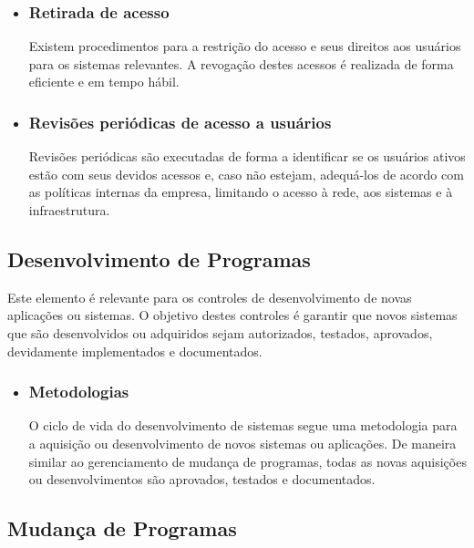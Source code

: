 \begin{itemize}
\item	\subsubsection{Retirada de acesso}
	Existem procedimentos para a restrição do acesso e seus direitos aos usuários para os sistemas relevantes. A revogação destes acessos é realizada de forma eficiente e em tempo hábil.
\item	\subsubsection{Revisões periódicas de acesso a usuários}
	Revisões periódicas são executadas de forma a identificar se os usuários ativos estão com seus devidos acessos e, caso não estejam, adequá-los de acordo com as políticas internas da empresa, limitando o acesso à rede, aos sistemas e à infraestrutura.
\end{itemize}
\subsection{Desenvolvimento de Programas}
	Este elemento é relevante para os controles de desenvolvimento de novas aplicações ou sistemas. O objetivo destes controles é garantir que novos sistemas que são desenvolvidos ou adquiridos sejam autorizados, testados, aprovados, devidamente implementados e documentados.
	
\begin{itemize}
\item	\subsubsection{Metodologias}
	O ciclo de vida do desenvolvimento de sistemas segue uma metodologia para a aquisição ou desenvolvimento de novos sistemas ou aplicações. De maneira similar ao gerenciamento de mudança de programas, todas as novas aquisições ou desenvolvimentos são aprovados, testados e documentados.
\end{itemize}

\subsection{Mudança de Programas}

